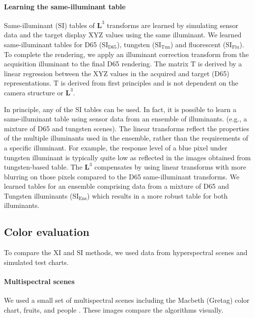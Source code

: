 \documentclass[]{spie}
\newcommand{\Lcube}{\boldsymbol L^3}
\newcommand{\XI}{\mathrm{XI}}
\newcommand{\SI}{\mathrm{SI}}
\newcommand{\SIT}{\mathrm{SI_{Tun}}}
\newcommand{\SIF}{\mathrm{SI_{Flu}}}
\newcommand{\SID}{\mathrm{SI_{D65}}}
\newcommand{\SIE}{\mathrm{SI_{Ens}}}
\newcommand{\TT}{\mathrm{T}}
\begin{document}
\paragraph{Learning the same-illuminant table} Same-illuminant ($\SI$) tables of $\Lcube$ transforms are learned by simulating sensor data and the target display XYZ values using the same illuminant. We learned same-illuminant tables for D65 ($\SID$), tungsten ($\SIT$) and fluorescent ($\SIF$). To complete the rendering, we apply an illuminant correction transform from the acquisition illuminant to the final D65 rendering. The matrix $\TT$ is derived by a linear regression between the XYZ values in the acquired and target (D65) representations. $\TT$ is derived from first principles and is not dependent on the camera structure or $\Lcube$. 

In principle, any of the SI tables can be used. In fact, it is possible to learn a same-illuminant table using sensor data from an ensemble of illuminants. (e.g., a mixture of D65 and tungsten scenes). The linear transforms reflect the properties of the multiple illuminants used in the ensemble, rather than the requirements of a specific illuminant. For example, the response level of a blue pixel under tungsten illuminant is typically quite low as reflected in the images obtained from tungsten-based table. The $\Lcube$ compensates by using linear transforms with more blurring on those pixels compared to the D65 same-illuminant transforms. We learned tables for an ensemble comprising data from a mixture of D65 and Tungsten illuminants ($\SIE$) which results in a more robust table for both illuminants.

\subsection{Color evaluation} 

To compare the $\XI$ and $\SI$ methods, we used data from hyperspectral scenes and simulated test charts.

\paragraph{Multispectral scenes} We used a small set of multispectral scenes including the Macbeth (Gretag) color chart, fruits, and people \cite{iset}. These images compare the algorithms visually.
\end{document}

